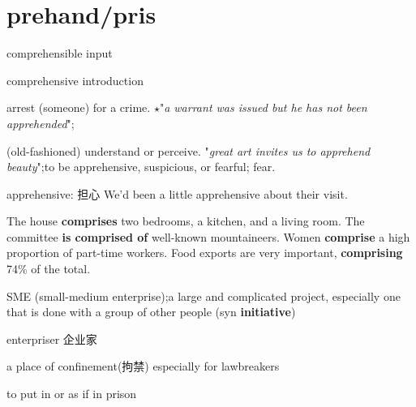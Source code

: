 \chapter{prehand/pris}

\begin{vocabulary}
    comprehensible input
\end{vocabulary}

\begin{vocabulary}[comprehensive]
    comprehensive introduction
\end{vocabulary}

\begin{vocabulary}arrest (someone) for a crime.
    $\star$"\textit{a warrant was issued but he has not been apprehended}";
    
    (old-fashioned) understand or perceive.
    "\textit{great art invites us to apprehend beauty}";to be apprehensive, suspicious, or fearful; fear.

    apprehensive: 担心 We'd been a little {apprehensive} about their visit.
\end{vocabulary}

\begin{vocabulary}[surprise]
\end{vocabulary}

\begin{vocabulary}[comprise]
    The house \textbf{comprises} two bedrooms, a kitchen, and a living room. The committee \textbf{is comprised of} well-known mountaineers. Women \textbf{comprise} a high proportion of part-time workers. Food exports are very important, \textbf{comprising} 74\% of the total.
\end{vocabulary}

\begin{vocabulary}
    SME (small-medium enterprise);a large and complicated project, especially one that is done with a group of other people (syn \textbf{initiative})

    enterpriser 企业家
\end{vocabulary}

\begin{vocabulary}[prison]
    a place of confinement(拘禁) especially for lawbreakers
\end{vocabulary}

\begin{vocabulary}[imprison]
    to put in or as if in prison
\end{vocabulary}
